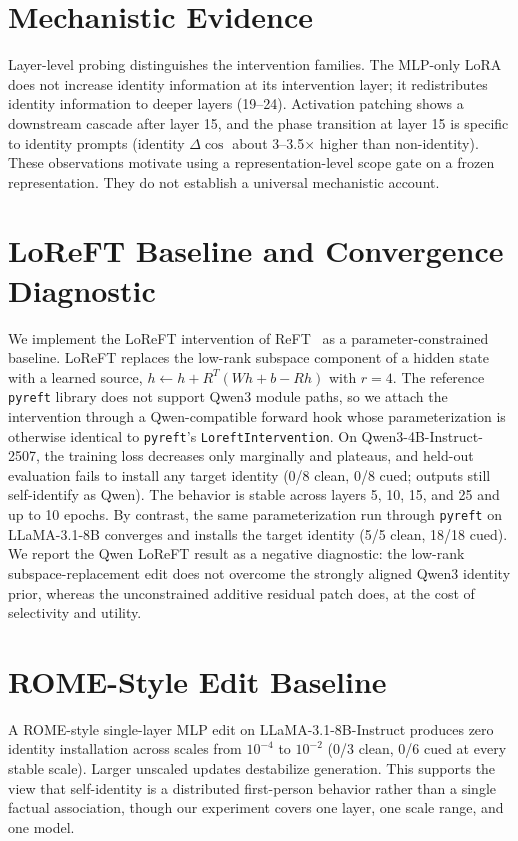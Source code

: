 \documentclass[11pt]{article}
\begin{document}
\section{Mechanistic Evidence}
\label{app:mechanistic}
Layer-level probing distinguishes the intervention families. The MLP-only LoRA does not increase identity information at its intervention layer; it redistributes identity information to deeper layers (19--24). Activation patching shows a downstream cascade after layer 15, and the phase transition at layer 15 is specific to identity prompts (identity $\Delta\cos$ about 3--3.5$\times$ higher than non-identity). These observations motivate using a representation-level scope gate on a frozen representation. They do not establish a universal mechanistic account.

\section{LoReFT Baseline and Convergence Diagnostic}
\label{app:loreft-diagnostic}
We implement the LoReFT intervention of ReFT~\cite{wu2024reft} as a parameter-constrained baseline. LoReFT replaces the low-rank subspace component of a hidden state with a learned source, $h \leftarrow h + R^{T}(Wh+b-Rh)$ with $r=4$. The reference \texttt{pyreft} library does not support Qwen3 module paths, so we attach the intervention through a Qwen-compatible forward hook whose parameterization is otherwise identical to \texttt{pyreft}'s \texttt{LoreftIntervention}. On Qwen3-4B-Instruct-2507, the training loss decreases only marginally and plateaus, and held-out evaluation fails to install any target identity (0/8 clean, 0/8 cued; outputs still self-identify as Qwen). The behavior is stable across layers 5, 10, 15, and 25 and up to 10 epochs. By contrast, the same parameterization run through \texttt{pyreft} on LLaMA-3.1-8B converges and installs the target identity (5/5 clean, 18/18 cued). We report the Qwen LoReFT result as a negative diagnostic: the low-rank subspace-replacement edit does not overcome the strongly aligned Qwen3 identity prior, whereas the unconstrained additive residual patch does, at the cost of selectivity and utility.

\section{ROME-Style Edit Baseline}
\label{app:rome}
A ROME-style single-layer MLP edit on LLaMA-3.1-8B-Instruct produces zero identity installation across scales from $10^{-4}$ to $10^{-2}$ (0/3 clean, 0/6 cued at every stable scale). Larger unscaled updates destabilize generation. This supports the view that self-identity is a distributed first-person behavior rather than a single factual association, though our experiment covers one layer, one scale range, and one model.
\end{document}
